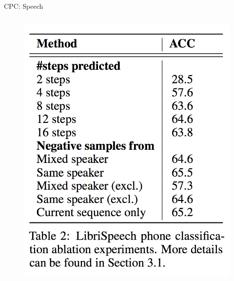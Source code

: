 \begin{frame}[allowframebreaks]{CPC: Speech}
\begin{columns}
        \begin{figure}
            \centering
            \includegraphics[width=1\linewidth,height=0.9\textheight,keepaspectratio]{images/ssl/slide_52_2_img.png}
        \end{figure}
    \end{columns}
\end{frame}

